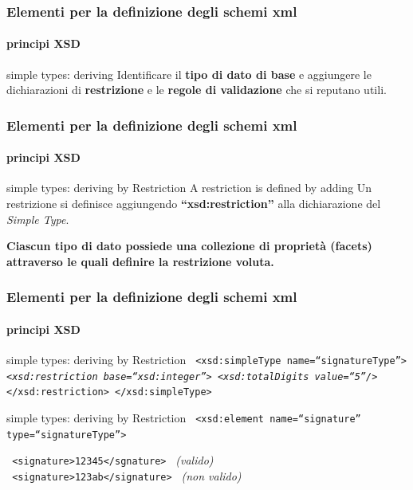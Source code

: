 \begin{frame}
	\frametitle{Elementi per la definizione degli schemi xml}
	\framesubtitle{principi XSD}
	\addtocounter{nframe}{1}

	\begin{block}{simple types: deriving}
		Identificare il \textbf{tipo di dato di base} e aggiungere le dichiarazioni di \textbf{restrizione} e le \textbf{regole di validazione} che si reputano utili.
	\end{block}

\end{frame}

\begin{frame}
	\frametitle{Elementi per la definizione degli schemi xml}
	\framesubtitle{principi XSD}
	\addtocounter{nframe}{1}

	\begin{block}{simple types: deriving by Restriction}
		A restriction is defined by adding
		Un restrizione si definisce aggiungendo \textbf{``xsd:restriction''} alla dichiarazione del \textit{Simple Type}. 
	\end{block}

	\textbf{Ciascun tipo di dato possiede una collezione di proprietà (facets) attraverso le quali definire la restrizione voluta.}

\end{frame}

\begin{frame}
	\frametitle{Elementi per la definizione degli schemi xml}
	\framesubtitle{principi XSD}
	\addtocounter{nframe}{1}

	\begin{block}{simple types: deriving by Restriction}
		\texttt{
			<xsd:simpleType name=``signatureType''>
			\emph{<xsd:restriction base=``xsd:integer''>}
			\emph{<xsd:totalDigits value=``5''/>}
			</xsd:restriction>
			</xsd:simpleType>
		}
	\end{block}

	\begin{block}{simple types: deriving by Restriction}
		\texttt{
			<xsd:element name=``signature'' type=``signatureType''>
		}
		
		
		\texttt{
			<signature>12345</sgnature>
		} \textit{(valido)}
		\\\texttt{
			<signature>123ab</signature>
		} \textit{(non valido)}
	\end{block}
\end{frame}



